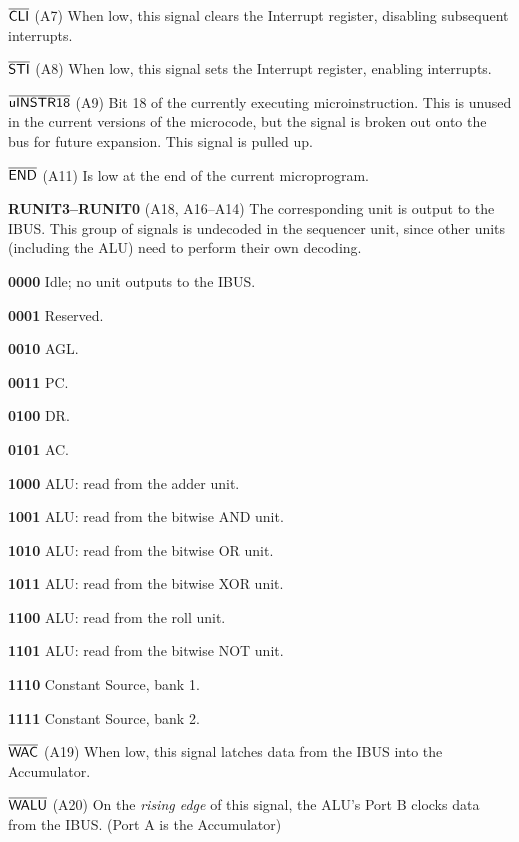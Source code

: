 \documentclass[11pt,a4paper,twocolumns]{article}
\newcommand{\ns}[1]{$\overline{\mbox{\textsf{{#1}}}}$}
\newcommand{\ps}[1]{\textsf{#1}}
\newcommand\bus[1]{{#1}}
\newcommand\unit[1]{{#1}}
\newcommand\IBUS{\bus{IBUS}}
\newcommand\ALU{\unit{ALU}}
\newcommand\AGL{\unit{AGL}}
\newcommand\register[1]{\textsf{#1}}
\newcommand\A{\register{AC}}
\newcommand\DR{\register{DR}}
\newcommand\PC{\register{PC}}
\newcommand\UINSTR{\ns{uINSTR18}}
\newcommand\END{\ns{END}}
\newcommand\RUNITn[1]{\ps{RUNIT{#1}}}
\newcommand\WAC{\ns{WAC}}
\newcommand\WALU{\ns{WALU}}
\newcommand\CLI{\ns{CLI}}
\newcommand\STI{\ns{STI}}
\begin{document}
\begin{description}
\item{\bf \CLI} (A7) When low, this signal clears the Interrupt register,
  disabling subsequent interrupts.
\item{\bf \STI} (A8) When low, this signal sets the Interrupt register, enabling interrupts.
\item{\bf \UINSTR} (A9) Bit 18 of the currently executing
  microinstruction. This is unused in the current versions of the
  microcode, but the signal is broken out onto the bus for future
  expansion. This signal is pulled up.
\item{\bf \END} (A11) Is low at the end of the current microprogram.
\item{\bf \RUNITn{3}–\RUNITn{0}} (A18, A16–A14) The corresponding
  unit is output to the \IBUS. This group of signals is undecoded in
  the sequencer unit, since other units (including the \ALU) need to
  perform their own decoding.
  \begin{description}
    \item{\bf \textsf{0000}} Idle; no unit outputs to the \IBUS.
    \item{\bf \textsf{0001}} Reserved.
    \item{\bf \textsf{0010}} \AGL.
    \item{\bf \textsf{0011}} \PC.
    \item{\bf \textsf{0100}} \DR.
    \item{\bf \textsf{0101}} \A.
    \item{\bf \textsf{1000}} \ALU: read from the adder unit.
    \item{\bf \textsf{1001}} \ALU: read from the bitwise AND unit.
    \item{\bf \textsf{1010}} \ALU: read from the bitwise OR unit.
    \item{\bf \textsf{1011}} \ALU: read from the bitwise XOR unit.
    \item{\bf \textsf{1100}} \ALU: read from the roll unit.
    \item{\bf \textsf{1101}} \ALU: read from the bitwise NOT unit.
    \item{\bf \textsf{1110}} Constant Source, bank 1.
    \item{\bf \textsf{1111}} Constant Source, bank 2.
  \end{description}
\item{\bf \WAC} (A19) When low, this signal latches data from the \IBUS{} into the Accumulator.
\item{\bf \WALU} (A20) On the {\em rising edge\/} of this signal, the \ALU's Port B clocks data from the \IBUS{}. (Port A is the Accumulator)

\end{description}
\end{document}
